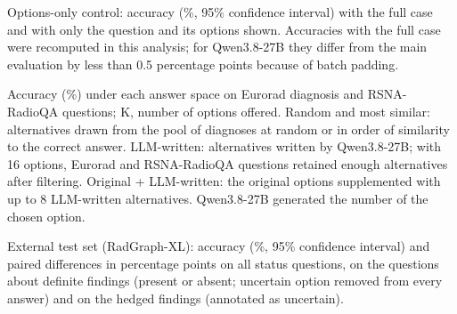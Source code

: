 \begin{table}[!h]
  \caption{Options-only control: accuracy (\%, 95\% confidence interval) with the full case and with only the question and its options shown. Accuracies with the full case were recomputed in this analysis; for Qwen3.8-27B they differ from the main evaluation by less than 0.5 percentage points because of batch padding.}
  \label{tab:v3_blind}
  \centering\footnotesize\setlength{\tabcolsep}{4pt}
  
\end{table}

\begin{table}[!h]
  \caption{Accuracy (\%) under each answer space on  Eurorad diagnosis and  RSNA-RadioQA questions; K, number of options offered. Random and most similar: alternatives drawn from the pool of diagnoses at random or in order of similarity to the correct answer. LLM-written: alternatives written by Qwen3.8-27B; with 16 options,  Eurorad and  RSNA-RadioQA questions retained enough alternatives after filtering. Original + LLM-written: the original options supplemented with up to 8 LLM-written alternatives. Qwen3.8-27B generated the number of the chosen option.}
  \label{tab:v3_answer_space}
  \centering\footnotesize\setlength{\tabcolsep}{4pt}
  
\end{table}

\begin{table}[!h]
  \caption{External test set (RadGraph-XL): accuracy (\%, 95\% confidence interval) and paired differences in percentage points on all  status questions, on the  questions about definite findings (present or absent; uncertain option removed from every answer) and on the  hedged findings (annotated as uncertain).}
  \label{tab:supp_external}
  \centering\footnotesize\setlength{\tabcolsep}{4pt}
  
\end{table}
